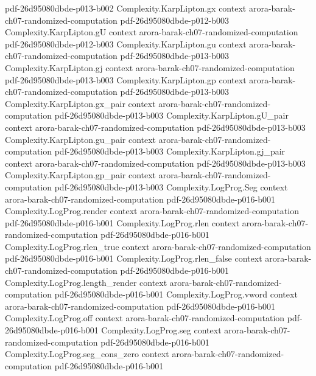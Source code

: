\begin{theorem}
  {pdf-26d95080dbde-p013-b002}
\proofstep
  {Complexity.KarpLipton.gx}
  {context}
  {arora-barak-ch07-randomized-computation}
  {pdf-26d95080dbde-p012-b003}
\proofstep
  {Complexity.KarpLipton.gU}
  {context}
  {arora-barak-ch07-randomized-computation}
  {pdf-26d95080dbde-p012-b003}
\proofstep
  {Complexity.KarpLipton.gu}
  {context}
  {arora-barak-ch07-randomized-computation}
  {pdf-26d95080dbde-p013-b003}
\proofstep
  {Complexity.KarpLipton.gj}
  {context}
  {arora-barak-ch07-randomized-computation}
  {pdf-26d95080dbde-p013-b003}
\proofstep
  {Complexity.KarpLipton.gp}
  {context}
  {arora-barak-ch07-randomized-computation}
  {pdf-26d95080dbde-p013-b003}
\proofstep
  {Complexity.KarpLipton.gx_pair}
  {context}
  {arora-barak-ch07-randomized-computation}
  {pdf-26d95080dbde-p013-b003}
\proofstep
  {Complexity.KarpLipton.gU_pair}
  {context}
  {arora-barak-ch07-randomized-computation}
  {pdf-26d95080dbde-p013-b003}
\proofstep
  {Complexity.KarpLipton.gu_pair}
  {context}
  {arora-barak-ch07-randomized-computation}
  {pdf-26d95080dbde-p013-b003}
\proofstep
  {Complexity.KarpLipton.gj_pair}
  {context}
  {arora-barak-ch07-randomized-computation}
  {pdf-26d95080dbde-p013-b003}
\proofstep
  {Complexity.KarpLipton.gp_pair}
  {context}
  {arora-barak-ch07-randomized-computation}
  {pdf-26d95080dbde-p013-b003}
\proofstep
  {Complexity.LogProg.Seg}
  {context}
  {arora-barak-ch07-randomized-computation}
  {pdf-26d95080dbde-p016-b001}
\proofstep
  {Complexity.LogProg.render}
  {context}
  {arora-barak-ch07-randomized-computation}
  {pdf-26d95080dbde-p016-b001}
\proofstep
  {Complexity.LogProg.rlen}
  {context}
  {arora-barak-ch07-randomized-computation}
  {pdf-26d95080dbde-p016-b001}
\proofstep
  {Complexity.LogProg.rlen_true}
  {context}
  {arora-barak-ch07-randomized-computation}
  {pdf-26d95080dbde-p016-b001}
\proofstep
  {Complexity.LogProg.rlen_false}
  {context}
  {arora-barak-ch07-randomized-computation}
  {pdf-26d95080dbde-p016-b001}
\proofstep
  {Complexity.LogProg.length_render}
  {context}
  {arora-barak-ch07-randomized-computation}
  {pdf-26d95080dbde-p016-b001}
\proofstep
  {Complexity.LogProg.vword}
  {context}
  {arora-barak-ch07-randomized-computation}
  {pdf-26d95080dbde-p016-b001}
\proofstep
  {Complexity.LogProg.off}
  {context}
  {arora-barak-ch07-randomized-computation}
  {pdf-26d95080dbde-p016-b001}
\proofstep
  {Complexity.LogProg.seg}
  {context}
  {arora-barak-ch07-randomized-computation}
  {pdf-26d95080dbde-p016-b001}
\proofstep
  {Complexity.LogProg.seg_cons_zero}
  {context}
  {arora-barak-ch07-randomized-computation}
  {pdf-26d95080dbde-p016-b001}

\end{theorem}
